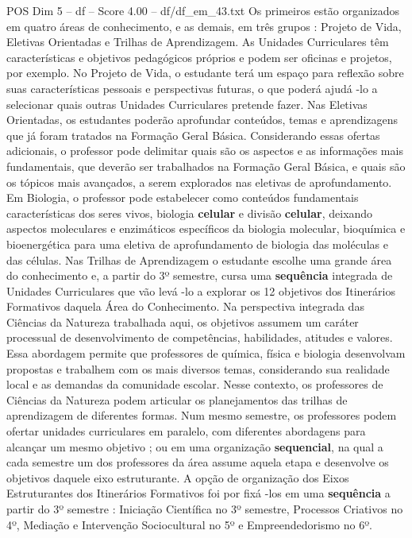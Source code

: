 \begin{textsample}{POS Dim 5 – df – Score 4.00 – df/df\_em\_43.txt}
Os primeiros estão organizados em quatro áreas de conhecimento, e as demais, em três grupos : Projeto de Vida, Eletivas Orientadas e Trilhas de Aprendizagem.
As Unidades Curriculares têm características e objetivos pedagógicos próprios e podem ser oficinas e projetos, por exemplo.
No Projeto de Vida, o estudante terá um espaço para reflexão sobre suas características pessoais e perspectivas futuras, o que poderá ajudá -lo a selecionar quais outras Unidades Curriculares pretende fazer.
Nas Eletivas Orientadas, os estudantes poderão aprofundar conteúdos, temas e aprendizagens que já foram tratados na Formação Geral Básica.
Considerando essas ofertas adicionais, o professor pode delimitar quais são os aspectos e as informações mais fundamentais, que deverão ser trabalhados na Formação Geral Básica, e quais são os tópicos mais avançados, a serem explorados nas eletivas de aprofundamento.
Em Biologia, o professor pode estabelecer como conteúdos fundamentais características dos seres vivos, biologia \textbf{celular} e divisão \textbf{celular}, deixando aspectos moleculares e enzimáticos específicos da biologia molecular, bioquímica e bioenergética para uma eletiva de aprofundamento de biologia das moléculas e das células.
Nas Trilhas de Aprendizagem o estudante escolhe uma grande área do conhecimento e, a partir do 3º semestre, cursa uma \textbf{sequência} integrada de Unidades Curriculares que vão levá -lo a explorar os 12 objetivos dos Itinerários Formativos daquela Área do Conhecimento.
Na perspectiva integrada das Ciências da Natureza trabalhada aqui, os objetivos assumem um caráter processual de desenvolvimento de competências, habilidades, atitudes e valores.
Essa abordagem permite que professores de química, física e biologia desenvolvam propostas e trabalhem com os mais diversos temas, considerando sua realidade local e as demandas da comunidade escolar.
Nesse contexto, os professores de Ciências da Natureza podem articular os planejamentos das trilhas de aprendizagem de diferentes formas.
Num mesmo semestre, os professores podem ofertar unidades curriculares em paralelo, com diferentes abordagens para alcançar um mesmo objetivo ; ou em uma organização \textbf{sequencial}, na qual a cada semestre um dos professores da área assume aquela etapa e desenvolve os objetivos daquele eixo estruturante.
A opção de organização dos Eixos Estruturantes dos Itinerários Formativos foi por fixá -los em uma \textbf{sequência} a partir do 3º semestre : Iniciação Científica no 3º semestre, Processos Criativos no 4º, Mediação e Intervenção Sociocultural no 5º e Empreendedorismo no 6º.

\end{textsample}

